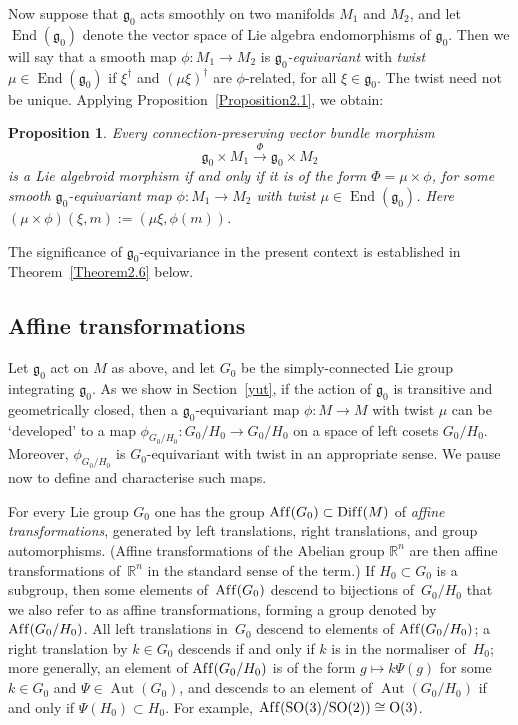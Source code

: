 \documentclass[11pt]{article}
\DeclareMathOperator{\affine}{Af\/f}
\DeclareMathOperator{\diff}{Dif\/f}
\DeclareMathOperator{\automorphism}{Aut}
\DeclareMathOperator{\selfmorphism}{End}
\numberwithin{equation}{section}
\newtheorem{PropositionBlaom}[TheoremBlaom]{Proposition}
 { \theoremstyle{definition}
\newtheorem{CounterexampleBlaom}[TheoremBlaom]{Counterexample}
\newtheorem{RemarkBlaom}[TheoremBlaom]{Remark} }
\begin{document}
Now suppose that ${\mathfrak g}_0 $ acts smoothly on two manifolds
$M_1$ and $M_2$, and let $\selfmorphism({\mathfrak g}_0)$ denote the
vector space of Lie algebra endomorphisms of ${\mathfrak g}_0$. Then
we will say that a smooth map $\phi \colon M_1 \rightarrow M_2$ is
{\it ${\mathfrak g}_0$-equivariant} with {\it twist
  $\mu\in\selfmorphism({\mathfrak g}_0)$} if $\xi^\dagger$ and $(\mu
\xi)^\dagger$ are $\phi $-related, for all $\xi\in {\mathfrak g}_0
$. The twist need not be unique.  Applying Proposition~\ref{Proposition2.1}, we
obtain:

\begin{PropositionBlaom}\label{Proposition2.2}
  Every connection-preserving vector bundle morphism
  \[
  {\mathfrak g}_0
  \times M_1 \xrightarrow{\Phi} {\mathfrak g}_0 \times M_2
  \]
 is a Lie
  algebroid morphism if and only if it is of the form $\Phi=\mu \times
  \phi$, for some smooth ${\mathfrak g}_0$-equivariant map $\phi
  \colon M_1 \rightarrow M_2$ with twist $\mu \in
  \selfmorphism({\mathfrak g}_0)$. Here $(\mu \times \phi)(\xi,m):=(\mu \xi,\phi(m))$.
\end{PropositionBlaom}


The signif\/icance of ${\mathfrak g}_0$-equivariance in the present
context is established in Theorem~\ref{Theorem2.6} below.

\subsection{Af\/f\/ine transformations}\label{affine}
Let ${\mathfrak g}_0$ act on $M$ as above, and let $G_0$ be the
simply-connected Lie group integrating ${\mathfrak g}_0$. As we show
in Section~\ref{yut}, if the action of ${\mathfrak g}_0$ is transitive and
geometrically closed, then a ${\mathfrak g}_0$-equivariant map $\phi
\colon M \rightarrow M$ with twist $\mu$ can be `developed' to a map
$\phi_{G_0/H_0} \colon G_0/H_0 \rightarrow G_0/H_0$ on a space of left
cosets $G_0/H_0$. Moreover, $\phi_{G_0/H_0}$ is $G_0$-equivariant with
twist in an appropriate sense. We pause now to def\/ine and characterise
such maps.

For every Lie group $G_0$ one has the group $\affine(G_0)\subset
\diff(M)$ of {\it affine transformations}, generated by left
translations, right translations, and group automorphisms. (Af\/f\/ine
transformations of the Abelian group ${\mathbb R}^n$ are then af\/f\/ine
transformations of~${\mathbb R}^n $ in the standard sense of the
term.) If $H_0 \subset G_0$ is a subgroup, then some elements of~$\affine(G_0)$ descend to bijections of~$G_0/H_0$ that we also refer
to as af\/f\/ine transformations, forming a group denoted by
$\affine(G_0/H_0)$. All left translations in~$G_0$ descend to elements
of $\affine(G_0/H_0)$; a right translation by $k \in G_0$ descends if
and only if $k$ is in the normaliser of~$H_0$; more generally, an
element of $\affine(G_0/H_0)$ is of the form $g \mapsto k\Psi(g)$ for
some $k \in G_0$ and $\Psi \in \automorphism(G_0)$, and descends to an
element of $\automorphism(G_0/H_0)$ if and only if $\Psi(H_0) \subset
H_0$. For example, $\affine({\rm SO}(3)/{\rm SO}(2))\cong
{\rm O}(3)$.
\end{document}
